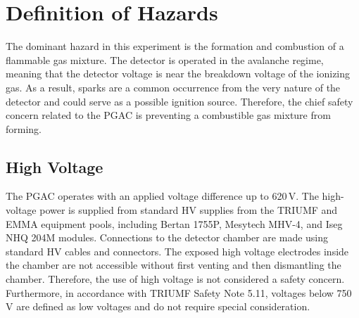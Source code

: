 \section{Definition of Hazards}
The dominant hazard in this experiment is the formation and combustion of a flammable gas
mixture.  The detector is operated in the avalanche regime, meaning that the detector voltage is near the breakdown voltage of the ionizing gas.  As a result, sparks are a common occurrence from the very nature of the detector and could serve as a possible ignition source.  Therefore, the chief safety concern related to the PGAC is preventing a combustible gas 
mixture from  forming.


\subsection{High Voltage}
The PGAC operates with an applied voltage difference up to 620\,V. The high-voltage power is supplied from standard HV supplies from the TRIUMF and EMMA equipment pools, including Bertan 1755P, Mesytech MHV-4, and Iseg NHQ 204M modules.  Connections to the detector chamber are made using standard HV cables and connectors. The exposed high voltage electrodes inside the chamber are not accessible without first venting and then dismantling the chamber.  Therefore, the use of high voltage is not considered a safety concern.  Furthermore, in accordance with TRIUMF Safety Note 5.11, voltages below 750\,V are defined as low voltages and do not require special consideration.

